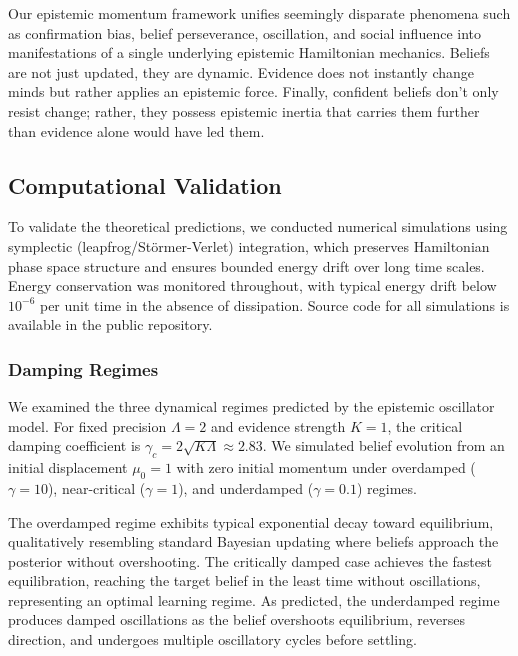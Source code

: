 \documentclass[12pt]{article}
\begin{document}
Our epistemic momentum framework unifies seemingly disparate phenomena such as confirmation bias, belief perseverance, oscillation, and social influence into manifestations of a single underlying epistemic Hamiltonian mechanics. Beliefs are not just updated, they are dynamic. Evidence does not instantly change minds but rather applies an epistemic force. Finally, confident beliefs don't only resist change; rather, they possess epistemic inertia that carries them further than evidence alone would have led them.

\subsection{Computational Validation}
\label{sec:computational_validation}

To validate the theoretical predictions, we conducted numerical simulations using symplectic (leapfrog/St\"ormer-Verlet) integration, which preserves Hamiltonian phase space structure and ensures bounded energy drift over long time scales. Energy conservation was monitored throughout, with typical energy drift below $10^{-6}$ per unit time in the absence of dissipation. Source code for all simulations is available in the public repository.

\subsubsection{Damping Regimes}

We examined the three dynamical regimes predicted by the epistemic oscillator model. For fixed precision $\Lambda = 2$ and evidence strength $K = 1$, the critical damping coefficient is $\gamma_c = 2\sqrt{K\Lambda} \approx 2.83$. We simulated belief evolution from an initial displacement $\mu_0 = 1$ with zero initial momentum under overdamped ($\gamma = 10$), near-critical ($\gamma = 1$), and underdamped ($\gamma = 0.1$) regimes.

The overdamped regime exhibits typical exponential decay toward equilibrium, qualitatively resembling standard Bayesian updating where beliefs approach the posterior without overshooting. The critically damped case achieves the fastest equilibration, reaching the target belief in the least time without oscillations, representing an optimal learning regime. As predicted, the underdamped regime produces damped oscillations as the belief overshoots equilibrium, reverses direction, and undergoes multiple oscillatory cycles before settling.
\end{document}
